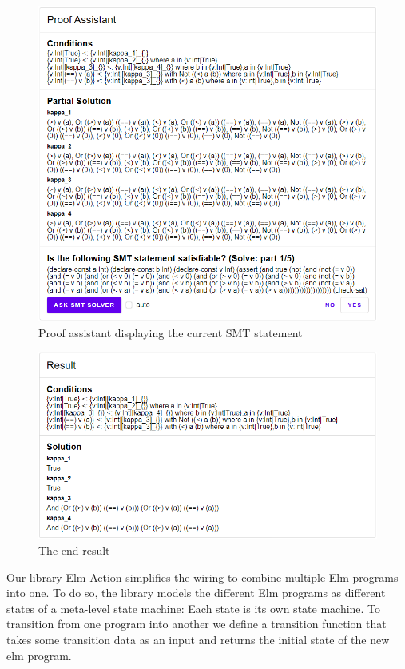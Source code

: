 \documentclass[]{scrbook}
\theoremstyle{definition}
\theoremstyle{definition}
\theoremstyle{definition}
\theoremstyle{remark}
\begin{document}
\begin{figure}

{\centering \includegraphics[width=0.75\linewidth]{assistant} 

}

\caption{Proof assistant displaying the current SMT statement}\label{fig:assistant}
\end{figure}

\begin{figure}

{\centering \includegraphics[width=0.75\linewidth]{done} 

}

\caption{The end result}\label{fig:done}
\end{figure}

Our library Elm-Action simplifies the wiring to combine multiple Elm
programs into one. To do so, the library models the different Elm
programs as different states of a meta-level state machine: Each state
is its own state machine. To transition from one program into another we
define a transition function that takes some transition data as an input
and returns the initial state of the new elm program.
\end{document}

